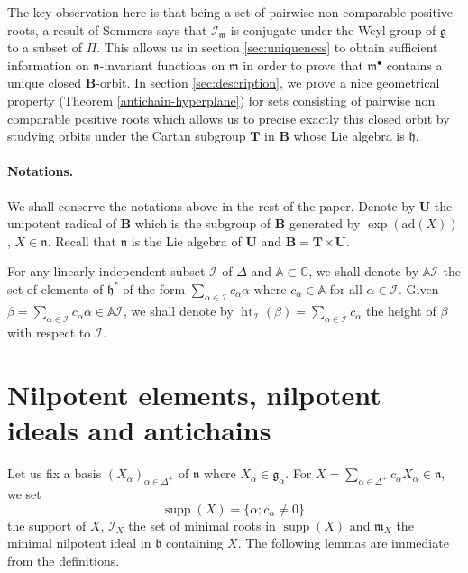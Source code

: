 \documentclass{amsart}
\theoremstyle{definition}
\theoremstyle{remark}
\numberwithin{equation}{section}
\newcommand{\supp}{\mathop{\mathrm{supp}}\nolimits}
\newcommand{\height}{\mathop{\mathrm{ht}}\nolimits}
\newcommand{\soc}[1]{\mathcal{I}_{#1}}
\newcommand{\group}[1]{\mathbf{#1}}
\begin{document}
The key observation here is that being a set of pairwise non comparable positive
roots, a result of Sommers \cite{So} says that $\soc{\mathfrak{m}}$ is conjugate 
under the Weyl group of $\mathfrak{g}$ to a subset of $\Pi$. This allows us 
in section \ref{sec:uniqueness} to obtain sufficient information on $\mathfrak{n}$-invariant functions on 
$\mathfrak{m}$ in order to prove that $\mathfrak{m}^{\bullet}$ contains a unique 
closed $\group{B}$-orbit. In section \ref{sec:description}, we prove a nice geometrical
property (Theorem \ref{antichain-hyperplane})
for sets consisting of pairwise non comparable positive roots which allows us to precise 
exactly this closed orbit by studying orbits under the Cartan subgroup $\group{T}$ in 
$\group{B}$ whose Lie algebra is $\mathfrak{h}$.
\smallskip

\paragraph{Notations.} We shall conserve the notations above in the rest of the paper. Denote by 
$\group{U}$ the unipotent radical of $\group{B}$ which is the subgroup of $\group{B}$ generated by 
$\exp (\mathrm{ad} (X) )$, 
$X\in \mathfrak{n}$. Recall that $\mathfrak{n}$ is the Lie algebra of $\group{U}$ and 
$\group{B} = \group{T} \ltimes \group{U}$.

For any linearly independent subset $\soc{}$ of $\Delta$ and 
$\mathbb{A} \subset \mathbb{C}$, we shall denote by 
$\mathbb{A} \soc{}$ the set of elements of $\mathfrak{h}^{*}$ of the form
$\sum_{\alpha\in \soc{}} c_{\alpha} \alpha$ where $c_{\alpha} \in \mathbb{A}$ for all $\alpha\in\soc{}$.
Given $\beta =  \sum_{\alpha\in \soc{}} c_{\alpha} \alpha \in \mathbb{A} \soc{}$, we shall denote by 
$\height_{\soc{}} (\beta ) =\sum_{\alpha\in \soc{}} c_{\alpha}$ the height of $\beta$ with respect to 
$\soc{}$.

\section{Nilpotent elements, nilpotent ideals and antichains}\label{sec:socle}

Let us fix a basis $(X_{\alpha})_{\alpha\in\Delta^{+}}$ of $\mathfrak{n}$ where 
$X_{\alpha}\in \mathfrak{g}_{\alpha}$.
For $X = \sum_{\alpha\in \Delta^{+}} c_{\alpha} X_{\alpha} \in\mathfrak{n}$, we set 
$$
\supp (X) = \{ \alpha ; c_{\alpha} \neq 0\} \ 
$$
the support of $X$, $\soc{X}$ the set of minimal roots in $\supp(X)$ and $\mathfrak{m}_{X}$ 
the minimal nilpotent ideal in $\mathfrak{b}$ containing $X$.
The following lemmas are immediate from the definitions.
\end{document}
